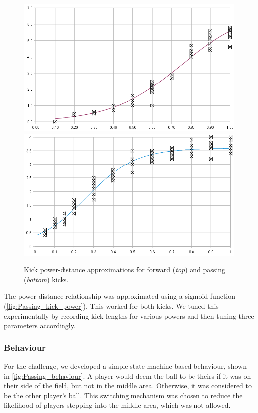 \documentclass[pdftex,11pt,a4paper]{report}
\begin{document}
\begin{figure}[p]
   \begin{center}
       \includegraphics[width=\textwidth]{figures/kick_forward_graph}\\
       \includegraphics[width=\textwidth]{figures/kick_passing_graph}
   \end{center}
   \caption{Kick power-distance approximations for forward (\emph{top})
   and passing (\emph{bottom}) kicks.}
   \label{fig:Passing_kick_power}
\end{figure}
The power-distance relationship was approximated using a sigmoid function
(\autoref{fig:Passing_kick_power}). This worked for both kicks. We tuned this
experimentally by recording kick lengths for various powers and then tuning
three parameters accordingly.

\subsubsection{Behaviour}
For the challenge, we developed a simple state-machine based behaviour,
shown in \autoref{fig:Passing_behaviour}. A player would deem the ball to be
theirs if it was on their side of the field, but not in the middle area.
Otherwise, it was considered to be the other player's ball. This switching
mechanism was chosen to reduce the likelihood of players stepping into the
middle area, which was not allowed.
\end{document}
